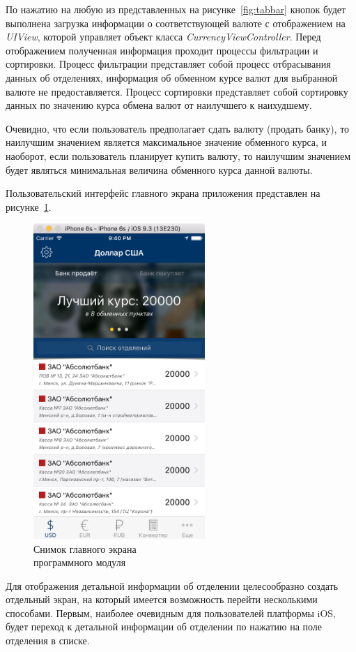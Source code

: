 По нажатию на любую из представленных на рисунке~\ref{fig:tabbar} кнопок будет
выполнена загрузка информации о соответствующей валюте с отображением
на \textit{UIView}, которой управляет объект класса \textit{CurrencyViewController}.
Перед отображением полученная информация проходит процессы фильтрации
и сортировки. Процесс фильтрации представляет собой процесс отбрасывания
данных об отделениях, информация об обменном курсе валют для выбранной валюте не
предоставляется. Процесс сортировки представляет собой сортировку данных
по значению курса обмена валют от наилучшего к наихудшему.

Очевидно, что если пользователь предполагает сдать
валюту (продать банку), то наилучшим значением
является максимальное значение обменного курса, и наоборот, если пользователь
планирует купить валюту, то наилучшим значением будет являться минимальная
величина обменного курса данной валюты.

Пользовательский интерфейс главного экрана приложения представлен на
рисунке~\ref{fig:main_screen}.
\begin{figure}[h!]
  \centering
  \includegraphics[width=65mm]{fig/main_screen}
  \caption{Снимок главного экрана \\ программного модуля}
  \label{fig:main_screen}
\end{figure}

\pagebreak

Для отображения детальной информации об отделении целесообразно создать отдельный
экран, на который имеется возможность перейти несколькими способами. Первым,
наиболее очевидным для пользователей платформы iOS, будет переход к детальной
информации об отделении по нажатию на поле отделения в списке.

